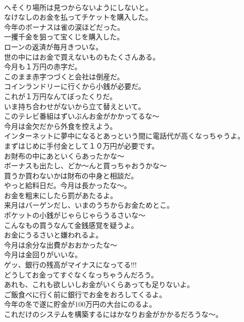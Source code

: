 \documentclass[8pt]{extreport}
\begin{document}
\begin{CJK}{UTF8}{min}
\\	へそくり場所は見つからないようにしないと。	
\\	なけなしのお金を払ってチケットを購入した。	
\\	今年のボーナスは雀の涙ほどだった。	
\\	一攫千金を狙って宝くじを購入した。	
\\	ローンの返済が毎月きついな。	
\\	世の中にはお金で買えないものもたくさんある。	
\\	今月も１万円の赤字だ。	
\\	このまま赤字つづくと会社は倒産だ。	
\\	コインランドリーに行くから小銭が必要だ。	
\\	これが１万円なんてぼったくりだ。	
\\	いま持ち合わせがないから立て替えといて。	
\\	このテレビ番組はずいぶんお金がかかってるな～	
\\	今月は金欠だから外食を控えよう。	
\\	インターネットに夢中になるとあっという間に電話代が高くなっちゃうよ。	
\\	まずはじめに手付金として１０万円が必要です。	
\\	お財布の中にあといくらあったかな～	
\\	ボーナスも出たし、どか～んと買っちゃおうかな～	
\\	買うか買わないかは財布の中身と相談だ。	
\\	やっと給料日だ。今月は長かったな～。	
\\	お金を粗末にしたら罰があたるよ。	
\\	来月はバーゲンだし、いまのうちからお金ためとこ。	
\\	ポケットの小銭がじゃらじゃらうるさいな～	
\\	こんなもの買うなんて金銭感覚を疑うよ。	
\\	お金にうるさいと嫌われるよ。
\\	今月は余分な出費がおおかったな～	
\\	今月は金回りがいいな。	
\\	ゲッ、銀行の残高がマイナスになってる!!!	
\\	どうしてお金ってすぐなくなっちゃうんだろう。	
\\	あれも、これも欲しいしお金がいくらあっても足りないよ。	
\\	ご飯食べに行く前に銀行でお金をおろしてくるよ。	
\\	今年の冬で遂に貯金が100万円の大台にのるよ。	
\\	これだけのシステムを構築するにはかなりお金がかかるだろうな～。	

\end{CJK}
\end{document}
